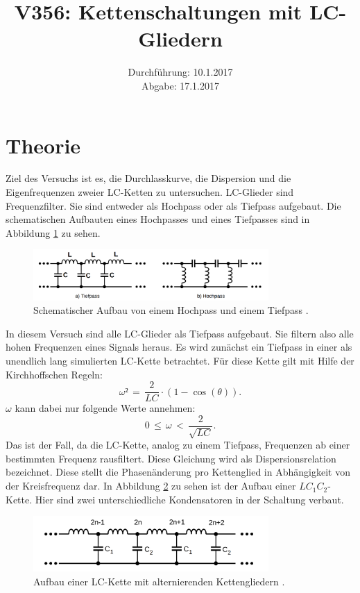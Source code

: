 \documentclass[
  bibliography=totoc,     %
  captions=tableheading,  %
  titlepage=firstiscover, %
]{scrartcl}
\title{V356: Kettenschaltungen mit LC-Gliedern}
\author{
  Simon Schulte
  \texorpdfstring{
    \\
    \href{mailto:simon.schulte@udo.edu}{simon.schulte@udo.edu}
  }{}
  \texorpdfstring{\and}{, }
  Tim Sedlaczek
  \texorpdfstring{
    \\
    \href{mailto:tim.sedlaczek@udo.edu}{tim.sedlaczek@udo.edu}
  }{}
}
\date{Durchführung: 10.1.2017\\
      Abgabe: 17.1.2017}
\begin{document}
\maketitle
\thispagestyle{empty}
\tableofcontents
\newpage
\section{Theorie}
\label{theorie}
Ziel des Versuchs ist es, die Durchlasskurve, die Dispersion und die
Eigenfrequenzen zweier LC-Ketten zu untersuchen.
LC-Glieder sind Frequenzfilter. Sie sind entweder als Hochpass oder als Tiefpass
aufgebaut. Die schematischen Aufbauten eines Hochpasses und eines Tiefpasses sind
in Abbildung \ref{fig:V3561} zu sehen.
\begin{figure}[htb]
  \centering
  \includegraphics[width=0.8\textwidth]{V3561.png}
  \caption{Schematischer Aufbau von einem Hochpass und einem Tiefpass \cite{anleitung}.}
  \label{fig:V3561}
\end{figure}
In diesem Versuch sind alle LC-Glieder als Tiefpass aufgebaut. Sie filtern also
alle hohen Frequenzen eines Signals heraus. Es wird zunächst ein Tiefpass in
einer als unendlich lang simulierten LC-Kette betrachtet. Für diese Kette gilt
mit Hilfe der Kirchhoffschen Regeln:
\begin{equation}
  \omega²\,=\,\frac{2}{LC}\cdot(1-\cos(\theta)).
  \label{eqn:dispersionsrelationLC}
\end{equation}
$\omega$ kann dabei nur folgende Werte annehmen:
\begin{equation}
  0\,\le\,\omega\,<\,\frac{2}{\sqrt{LC}}.
  \label{eqn:grenzwertdispersLC}
\end{equation}
Das ist der Fall, da die LC-Kette, analog zu einem Tiefpass, Frequenzen ab einer
bestimmten Frequenz rausfiltert.
Diese Gleichung wird als Dispersionsrelation bezeichnet. Diese stellt die
Phasenänderung pro Kettenglied in Abhängigkeit von der Kreisfrequenz dar.
In Abbildung \ref{fig:V3562} zu sehen ist der Aufbau einer $LC_1C_2$-Kette.
Hier sind zwei unterschiedliche Kondensatoren in der Schaltung verbaut.
\begin{figure}[htb]
  \centering
  \includegraphics[width=0.8\textwidth]{V3562.png}
  \caption{Aufbau einer LC-Kette mit alternierenden Kettengliedern \cite{anleitung}.}
  \label{fig:V3562}
\end{figure}
\end{document}
